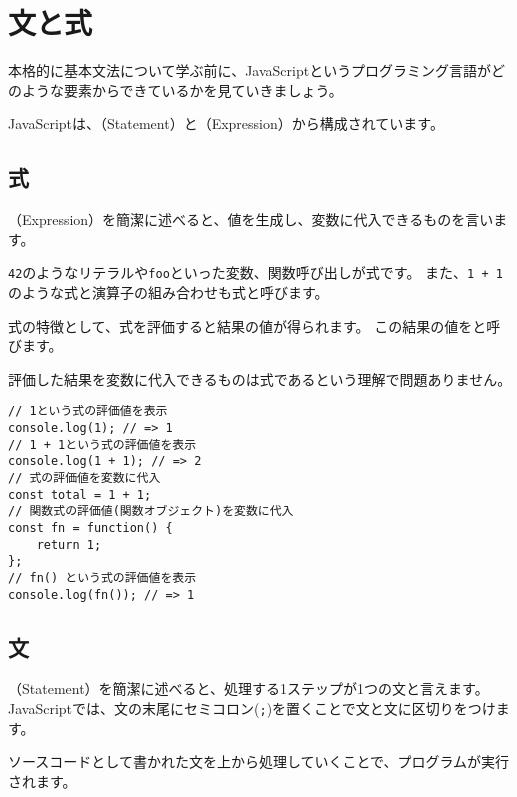 \hypertarget{statement-and-expression}{%
\chapter{文と式}\label{statement-and-expression}}
\thispagestyle{frontheadings}

本格的に基本文法について学ぶ前に、JavaScriptというプログラミング言語がどのような要素からできているかを見ていきましょう。

JavaScriptは、\textbf{}（Statement）と\textbf{}（Expression）から構成されています。

\hypertarget{expression}{%
\section{式}\label{expression}}

\textbf{}（Expression）を簡潔に述べると、値を生成し、変数に代入できるものを言います。

\texttt{42}のようなリテラルや\texttt{foo}といった変数、関数呼び出しが式です。
また、\texttt{1 + 1}のような式と演算子の組み合わせも式と呼びます。

式の特徴として、式を評価すると結果の値が得られます。
この結果の値を\textbf{}と呼びます。

評価した結果を変数に代入できるものは式であるという理解で問題ありません。

\begin{lstlisting}
// 1という式の評価値を表示
console.log(1); // => 1
// 1 + 1という式の評価値を表示
console.log(1 + 1); // => 2
// 式の評価値を変数に代入
const total = 1 + 1;
// 関数式の評価値(関数オブジェクト)を変数に代入
const fn = function() {
    return 1;
};
// fn() という式の評価値を表示
console.log(fn()); // => 1
\end{lstlisting}

\hypertarget{statement}{%
\section{文}\label{statement}}

\textbf{}（Statement）を簡潔に述べると、処理する1ステップが1つの文と言えます。
JavaScriptでは、文の末尾にセミコロン(\texttt{;})を置くことで文と文に区切りをつけます。

ソースコードとして書かれた文を上から処理していくことで、プログラムが実行されます。

